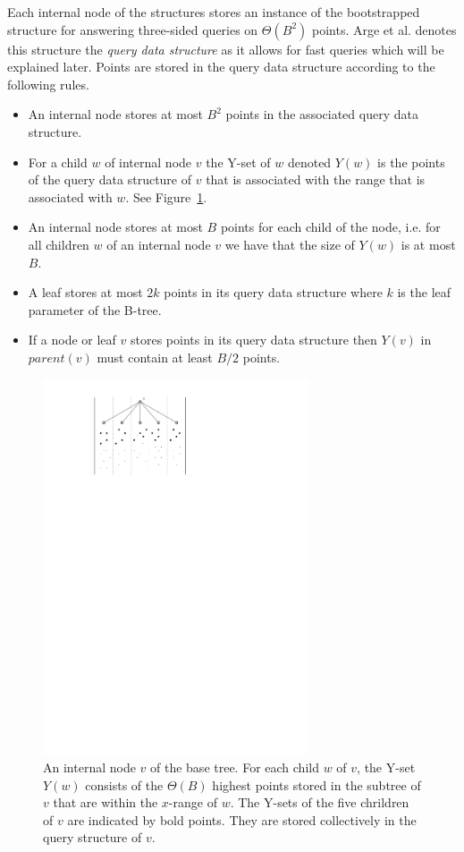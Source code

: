 \documentclass[twoside,11pt,openright]{report}
\begin{document}
Each internal node of the structures stores an instance of the bootstrapped structure for answering three-sided queries on $\Theta(B^2)$ points. Arge et al. denotes this structure the \textit{query data structure} as it allows for fast queries which will be explained later. Points are stored in the query data structure according to the following rules.
\begin{itemize}
	\item{An internal node stores at most $B^2$ points in the associated query data structure.}
	\item{For a child $w$ of internal node $v$ the Y-set of $w$ denoted $Y(w)$ is the points of the query data structure of $v$ that is associated with the range that is associated with $w$. See Figure~\ref{fig:arge_child_strucutre}.}
	\item{An internal node stores at most $B$ points for each child of the node, i.e. for all children $w$ of an internal node $v$ we have that the size of $Y(w)$ is at most $B$.}
	\item{A leaf stores at most $2k$ points in its query data structure where $k$ is the leaf parameter of the B-tree.}
	\item{If a node or leaf $v$ stores points in its query data structure then $Y(v)$ in $parent(v)$ must contain at least $B/2$ points.}
\end{itemize}

\begin{figure}[h]
	\centering
	\includegraphics[width=0.7\textwidth]{../figures/arge_child_structure}
	\caption{An internal node $v$ of the base tree. For each child $w$ of $v$, the Y-set $Y(w)$ consists of the $\Theta(B)$ highest points stored in the subtree of $v$ that are within the $x$-range of $w$. The Y-sets of the five chrildren of $v$ are indicated by bold points. They are stored collectively in the query structure of $v$.}
	\label{fig:arge_child_strucutre}
\end{figure}
\end{document}
